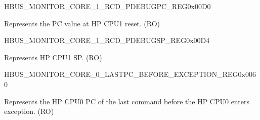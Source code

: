 \begin{register}{H}{BUS\_MONITOR\_CORE\_1\_RCD\_PDEBUGPC\_REG}{0x00D0}\label{regdesc:BUSMONITORCORE1RCDPDEBUGPCREG}
%
\regnewline%
\begin{regdesc}\begin{reglist}
\label{fielddesc:BUSMONITORCORE1RCDPDEBUGPC}\item [BUS\_MONITOR\_CORE\_1\_RCD\_PDEBUGPC] Represents the PC value at HP CPU1 reset. (RO)
\end{reglist}\end{regdesc}
\end{register}


\begin{register}{H}{BUS\_MONITOR\_CORE\_1\_RCD\_PDEBUGSP\_REG}{0x00D4}\label{regdesc:BUSMONITORCORE1RCDPDEBUGSPREG}
%
\regnewline%
\begin{regdesc}\begin{reglist}
\label{fielddesc:BUSMONITORCORE1RCDPDEBUGSP}\item [BUS\_MONITOR\_CORE\_1\_RCD\_PDEBUGSP] Represents  HP CPU1 SP. (RO)
\end{reglist}\end{regdesc}
\end{register}


\begin{register}{H}{BUS\_MONITOR\_CORE\_0\_LASTPC\_BEFORE\_EXCEPTION\_REG}{0x0060}\label{regdesc:BUSMONITORCORE0LASTPCBEFOREEXCEPTIONREG}
%
\regnewline%
\begin{regdesc}\begin{reglist}
\label{fielddesc:BUSMONITORCORE0LASTPCBEFOREEXC}\item [BUS\_MONITOR\_CORE\_0\_LASTPC\_BEFORE\_EXC] Represents the  HP CPU0 PC of the last command before the HP CPU0 enters exception. (RO)
\end{reglist}\end{regdesc}
\end{register}


